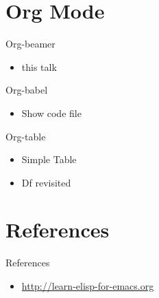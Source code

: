 \documentclass[bigger]{beamer}
\begin{document}
\section{Org Mode}
\label{sec-7}
\begin{frame}[label=sec-7-1]{Org-beamer}
\begin{itemize}
\item this talk
\end{itemize}
\end{frame}

\begin{frame}[label=sec-7-2]{Org-babel}
\begin{itemize}
\item Show code file
\end{itemize}
\end{frame}

\begin{frame}[label=sec-7-3]{Org-table}
\begin{itemize}
\item Simple Table
\item Df revisited
\end{itemize}
\end{frame}

\section{References}
\label{sec-8}
\begin{frame}[label=sec-8-1]{References}
\begin{itemize}
\item \url{http://learn-elisp-for-emacs.org}
\end{itemize}
\end{frame}
\end{document}
